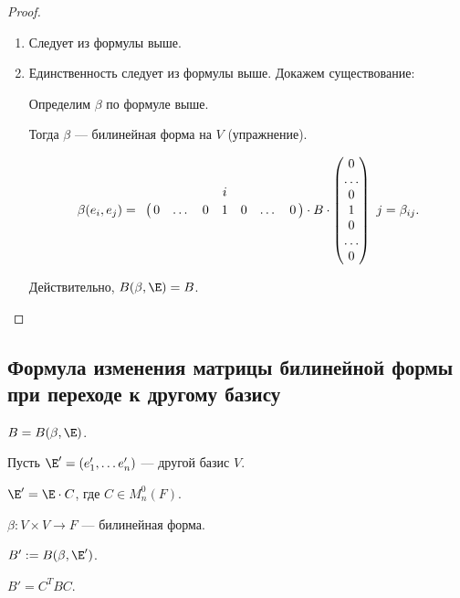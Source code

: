 \begin{proof}~
    \begin{enumerate}
    \item Следует из формулы выше.
    \item Единственность следует из формулы выше. Докажем существование:

        Определим $\beta$ по формуле выше.

        Тогда $\beta$ --- билинейная форма на $V$ (упражнение).

        \begin{equation*}
            \beta(e_i, e_j) = \bordermatrix{
                  &   &   &   & i &   &   &  \cr
                  & 0 & \dots & 0 & 1 & 0 & \dots & 0
            } \cdot B \cdot \begin{pmatrix} 
                0 \\ \dots \\ 0 \\ 1 \\ 0 \\ \dots \\ 0
            \end{pmatrix} \ j = \beta_{ij}
        .\end{equation*}

        Действительно, $B(\beta, \E) = B$.
        \qedhere
    \end{enumerate}
\end{proof}


\subsection{Формула изменения матрицы билинейной формы при переходе к другому базису}

$B = B(\beta, \E)$.

Пусть $\E' = (e'_1, \dots e'_n)$ --- другой базис $V$.

$\E' = \E \cdot C$, где $C \in M^{0}_n(F)$.

$\beta \colon V \times V \to F$ --- билинейная форма.

$B' := B(\beta, \E')$.

\begin{proposal}
    \label{lec19:bilinear_basis_change}
    $B' = C^{T} B C$.
\end{proposal}

